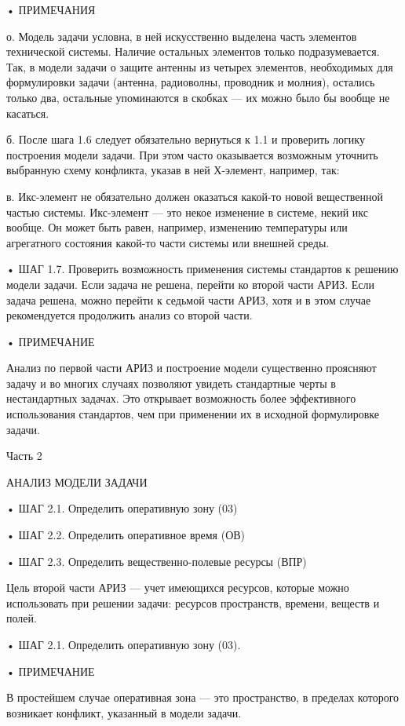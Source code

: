 • ПРИМЕЧАНИЯ

о.  Модель   задачи  условна,   в  ней  искусственно   выделена  часть
элементов  технической  системы.  Наличие остальных  элементов  только
подразумевается.  Так, в  модели задачи  о защите  антенны из  четырех
элементов, необходимых  для формулировки задачи  (антенна, радиоволны,
проводник  и молния),  остались  только два,  остальные упоминаются  в
скобках — их можно было бы вообще не касаться.

б.  После шага  1.6 следует  обязательно вернуться  к 1.1  и проверить
логику построения модели задачи.  При этом часто оказывается возможным
уточнить выбранную схему конфликта,  указав в ней Х-элемент, например,
так:



в.  Икс-элемент   не  обязательно  должен  оказаться   какой-то  новой
вещественной  частью  системы. Икс-элемент  —  это  некое изменение  в
системе, некий  икс вообще. Он  может быть равен,  например, изменению
температуры  или  агрегатного  состояния какой-то  части  системы  или
внешней среды.


•  ШАГ  1.7. Проверить  возможность  применения  системы стандартов  к
решению модели задачи. Если задача  не решена, перейти ко второй части
АРИЗ. Если задача решена, можно перейти к седьмой части АРИЗ, хотя и в
этом случае рекомендуется продолжить анализ со второй части.


• ПРИМЕЧАНИЕ

Анализ по первой части АРИЗ  и построение модели существенно проясняют
задачу  и во  многих  случаях позволяют  увидеть  стандартные черты  в
нестандартных  задачах. Это  открывает возможность  более эффективного
использования   стандартов,  чем   при   применении   их  в   исходной
формулировке задачи.


Часть 2

АНАЛИЗ МОДЕЛИ ЗАДАЧИ

• ШАГ 2.1. Определить оперативную зону (03)

• ШАГ 2.2. Определить оперативное время (ОВ)

• ШАГ 2.3. Определить вещественно-полевые ресурсы (ВПР)


Цель  второй  части АРИЗ  —  учет  имеющихся ресурсов,  которые  можно
использовать  при  решении   задачи:  ресурсов  пространств,  времени,
веществ и полей.

• ШАГ 2.1. Определить оперативную зону (03).

• ПРИМЕЧАНИЕ

В простейшем  случае оперативная зона  — это пространство,  в пределах
которого возникает конфликт, указанный в модели задачи.


